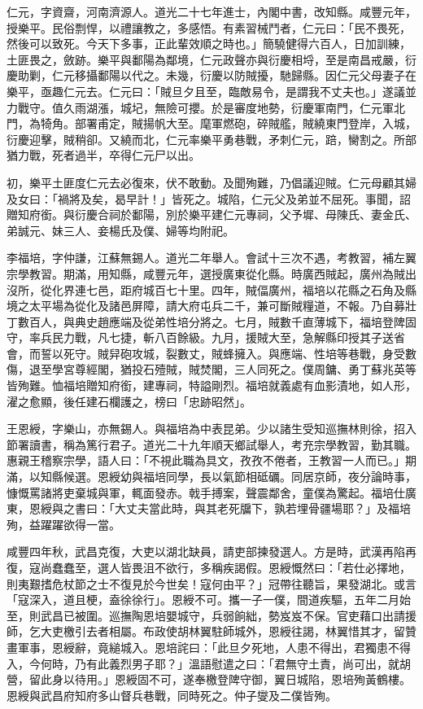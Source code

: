 \begin{pinyinscope}
仁元，字資齋，河南濟源人。道光二十七年進士，內閣中書，改知縣。咸豐元年，授樂平。民俗剽悍，以禮讓教之，多感悟。有素習械鬥者，仁元曰：「民不畏死，然後可以致死。今天下多事，正此輩效順之時也。」簡驍健得六百人，日加訓練，土匪畏之，斂跡。樂平與鄱陽為鄰境，仁元政聲亦與衍慶相埒，至是南昌戒嚴，衍慶助剿，仁元移攝鄱陽以代之。未幾，衍慶以防賊擾，馳歸縣。因仁元父母妻子在樂平，亟趣仁元去。仁元曰：「賊旦夕且至，臨敵易令，是謂我不丈夫也。」遂議並力戰守。值久雨湖漲，城圮，無險可攖。於是審度地勢，衍慶軍南門，仁元軍北門，為犄角。部署甫定，賊揚帆大至。麾軍燃砲，碎賊艦，賊繞東門登岸，入城，衍慶迎擊，賊稍卻。又繞而北，仁元率樂平勇巷戰，矛刺仁元，踣，臠割之。所部猶力戰，死者過半，卒得仁元尸以出。

初，樂平土匪度仁元去必復來，伏不敢動。及聞殉難，乃倡議迎賊。仁元母顧其婦及女曰：「禍將及矣，曷早計！」皆死之。城陷，仁元父及弟並不屈死。事聞，詔贈知府銜。與衍慶合祠於鄱陽，別於樂平建仁元專祠，父予墀、母陳氏、妻金氏、弟誠元、妹三人、妾楊氏及僕、婦等均附祀。

李福培，字仲謙，江蘇無錫人。道光二年舉人。會試十三次不遇，考教習，補左翼宗學教習。期滿，用知縣，咸豐元年，選授廣東從化縣。時廣西賊起，廣州為賊出沒所，從化界連七邑，距府城百七十里。四年，賊偪廣州，福培以花縣之石角及縣境之太平場為從化及諸邑屏障，請大府屯兵二千，兼可斷賊糧道，不報。乃自募壯丁數百人，與典史趙應端及從弟性培分將之。七月，賊數千直薄城下，福培登陴固守，率兵民力戰，凡七捷，斬八百餘級。九月，援賊大至，急解縣印授其子送省會，而誓以死守。賊舁砲攻城，裂數丈，賊蜂擁入。與應端、性培等巷戰，身受數傷，退至學宮尊經閣，猶投石殪賊，賊焚閣，三人同死之。僕周鏞、勇丁蘇兆英等皆殉難。恤福培贈知府銜，建專祠，特謚剛烈。福培就義處有血影漬地，如人形，濯之愈顯，後任建石欄護之，榜曰「忠跡昭然」。

王恩綬，字樂山，亦無錫人。與福培為中表昆弟。少以諸生受知巡撫林則徐，招入節署讀書，稱為篤行君子。道光二十九年順天鄉試舉人，考充宗學教習，勤其職。惠親王稽察宗學，語人曰：「不視此職為具文，孜孜不倦者，王教習一人而已。」期滿，以知縣候選。恩綬幼與福培同學，長以氣節相砥礪。同居京師，夜分論時事，慷慨罵諸將吏棄城與軍，輒面發赤。戟手搏案，聲震鄰舍，童僕為驚起。福培仕廣東，恩綬與之書曰：「大丈夫當此時，與其老死牖下，孰若埋骨疆場耶？」及福培殉，益躍躍欲得一當。

咸豐四年秋，武昌克復，大吏以湖北缺員，請吏部揀發選人。方是時，武漢再陷再復，寇尚蠢蠢至，選人皆畏沮不欲行，多稱疾謁假。恩綬慨然曰：「若仕必擇地，則夷艱搘危杖節之士不復見於今世矣！寇何由平？」冠帶往聽旨，果發湖北。或言「寇深入，道且梗，盍徐徐行」。恩綬不可。攜一子一僕，間道疾驅，五年二月始至，則武昌已被圍。巡撫陶恩培嬰城守，兵弱餉絀，勢岌岌不保。官吏藉口出請援師，乞大吏檄引去者相屬。布政使胡林翼駐師城外，恩綬往謁，林翼惜其才，留贊畫軍事，恩綬辭，竟縋城入。恩培詫曰：「此旦夕死地，人患不得出，君獨患不得入，今何時，乃有此義烈男子耶？」溫語慰遣之曰：「君無守土責，尚可出，就胡營，留此身以待用。」恩綬固不可，遂奉檄登陴守御，翼日城陷，恩培殉黃鶴樓。恩綬與武昌府知府多山督兵巷戰，同時死之。仲子燮及二僕皆殉。


\end{pinyinscope}
